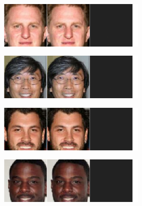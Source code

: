 \documentclass{article}
\begin{document}
\begin{figure}
\begin{subfigure}{1.\textwidth}
    \begin{subfigure}{.245\textwidth}
      \centering
      \includegraphics[width=1\linewidth]{img/fooling/AddingMoustache_52_1LipSigmoid.png}
      \label{fig:AddingMoustache_52_Lip_binCross}
    \end{subfigure}%
    \begin{subfigure}{.245\textwidth}
      \centering
      \includegraphics[width=1\linewidth]{img/fooling/AddingMoustache_54_1LipSigmoid.png}
      \label{fig:AddingMoustache_54_Lip_binCross}
    \end{subfigure} 
    \begin{subfigure}{.245\textwidth}
      \centering
      \includegraphics[width=1\linewidth]{img/fooling/remove_mustache_1489_1LipSigmoid.png}
      \label{fig:remove_mustache_1489_Lip_binCross}
    \end{subfigure}  
    \begin{subfigure}{.245\textwidth}
      \centering
      \includegraphics[width=1\linewidth]{img/fooling/remove_mustache_6850_1LipSigmoid.png}

\end{subfigure}
\end{subfigure}
\end{figure}
\end{document}
